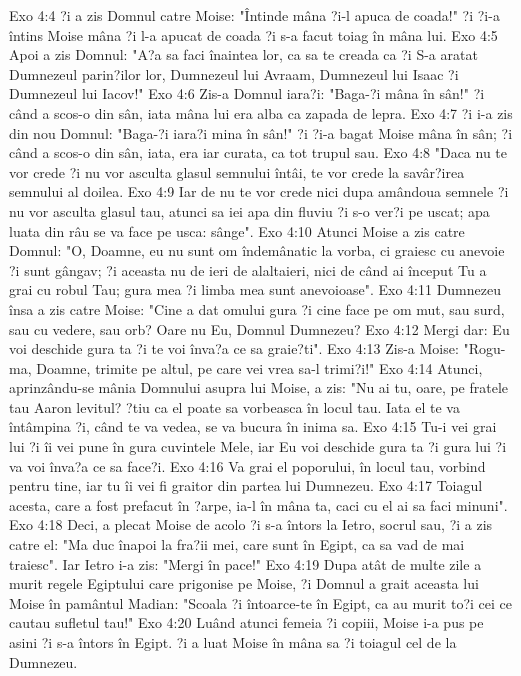 Exo 4:4  ?i a zis Domnul catre Moise: "Întinde mâna ?i-l apuca de coada!" ?i ?i-a întins Moise mâna ?i l-a apucat de coada ?i s-a facut toiag în mâna lui.
Exo 4:5  Apoi a zis Domnul: "A?a sa faci înaintea lor, ca sa te creada ca ?i S-a aratat Dumnezeul parin?ilor lor, Dumnezeul lui Avraam, Dumnezeul lui Isaac ?i Dumnezeul lui Iacov!"
Exo 4:6  Zis-a Domnul iara?i: "Baga-?i mâna în sân!" ?i când a scos-o din sân, iata mâna lui era alba ca zapada de lepra.
Exo 4:7  ?i i-a zis din nou Domnul: "Baga-?i iara?i mina în sân!" ?i ?i-a bagat Moise mâna în sân; ?i când a scos-o din sân, iata, era iar curata, ca tot trupul sau.
Exo 4:8  "Daca nu te vor crede ?i nu vor asculta glasul semnului întâi, te vor crede la savâr?irea semnului al doilea.
Exo 4:9  Iar de nu te vor crede nici dupa amândoua semnele ?i nu vor asculta glasul tau, atunci sa iei apa din fluviu ?i s-o ver?i pe uscat; apa luata din râu se va face pe usca: sânge".
Exo 4:10  Atunci Moise a zis catre Domnul: "O, Doamne, eu nu sunt om îndemânatic la vorba, ci graiesc cu anevoie ?i sunt gângav; ?i aceasta nu de ieri de alaltaieri, nici de când ai început Tu a grai cu robul Tau; gura mea ?i limba mea sunt anevoioase".
Exo 4:11  Dumnezeu însa a zis catre Moise: "Cine a dat omului gura ?i cine face pe om mut, sau surd, sau cu vedere, sau orb? Oare nu Eu, Domnul Dumnezeu?
Exo 4:12  Mergi dar: Eu voi deschide gura ta ?i te voi înva?a ce sa graie?ti".
Exo 4:13  Zis-a Moise: "Rogu-ma, Doamne, trimite pe altul, pe care vei vrea sa-l trimi?i!"
Exo 4:14  Atunci, aprinzându-se mânia Domnului asupra lui Moise, a zis: "Nu ai tu, oare, pe fratele tau Aaron levitul? ?tiu ca el poate sa vorbeasca în locul tau. Iata el te va întâmpina ?i, când te va vedea, se va bucura în inima sa.
Exo 4:15  Tu-i vei grai lui ?i îi vei pune în gura cuvintele Mele, iar Eu voi deschide gura ta ?i gura lui ?i va voi înva?a ce sa face?i.
Exo 4:16  Va grai el poporului, în locul tau, vorbind pentru tine, iar tu îi vei fi graitor din partea lui Dumnezeu.
Exo 4:17  Toiagul acesta, care a fost prefacut în ?arpe, ia-l în mâna ta, caci cu el ai sa faci minuni".
Exo 4:18  Deci, a plecat Moise de acolo ?i s-a întors la Ietro, socrul sau, ?i a zis catre el: "Ma duc înapoi la fra?ii mei, care sunt în Egipt, ca sa vad de mai traiesc". Iar Ietro i-a zis: "Mergi în pace!"
Exo 4:19  Dupa atât de multe zile a murit regele Egiptului care prigonise pe Moise, ?i Domnul a grait aceasta lui Moise în pamântul Madian: "Scoala ?i întoarce-te în Egipt, ca au murit to?i cei ce cautau sufletul tau!"
Exo 4:20  Luând atunci femeia ?i copiii, Moise i-a pus pe asini ?i s-a întors în Egipt. ?i a luat Moise în mâna sa ?i toiagul cel de la Dumnezeu.
